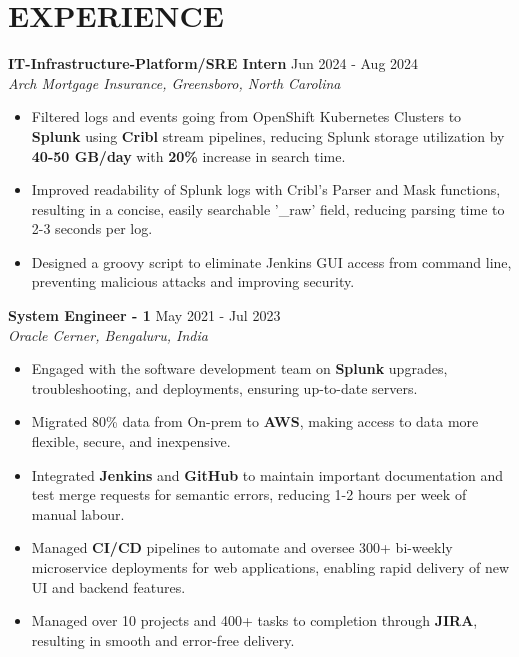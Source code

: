 \documentclass[a4paper,9pt]{extarticle}
\begin{document}
\section*{EXPERIENCE}
\noindent
\textbf{IT-Infrastructure-Platform/SRE Intern}
\hfill Jun 2024 - Aug 2024\\ %
\textit{Arch Mortgage Insurance, Greensboro, North Carolina}
\begin{itemize}
    \item Filtered logs and events going from OpenShift Kubernetes Clusters to \textbf{Splunk} using \textbf{Cribl} stream pipelines, reducing Splunk storage utilization by \textbf{40-50 GB/day} with \textbf{20\%} increase in search time.
    \item Improved readability of Splunk logs with Cribl's Parser and Mask functions, resulting in a concise, easily searchable '\_raw' field, reducing parsing time to 2-3 seconds per log.
    \item Designed a groovy script to eliminate Jenkins GUI access from command line, preventing malicious attacks and improving security.
    

\end{itemize}

\noindent
\textbf{System Engineer - 1}
\hfill May 2021 - Jul 2023\\ %
\textit{Oracle Cerner, Bengaluru, India}
\begin{itemize}
    \item Engaged with the software development team on \textbf{Splunk} upgrades, troubleshooting, and deployments, ensuring up-to-date servers.
    \item Migrated 80\% data from On-prem to \textbf{AWS}, making access to data more flexible, secure, and inexpensive.
    \item Integrated \textbf{Jenkins} and \textbf{GitHub} to maintain important documentation and test merge requests for semantic errors, reducing 1-2 hours per week of manual labour.
    \item Managed \textbf{CI/CD} pipelines to automate and oversee 300+ bi-weekly microservice deployments for web applications, enabling rapid delivery of new UI and backend features.
    \item Managed over 10 projects and 400+ tasks to completion through \textbf{JIRA}, resulting in smooth and error-free delivery. 
\end{itemize}
\end{document}
